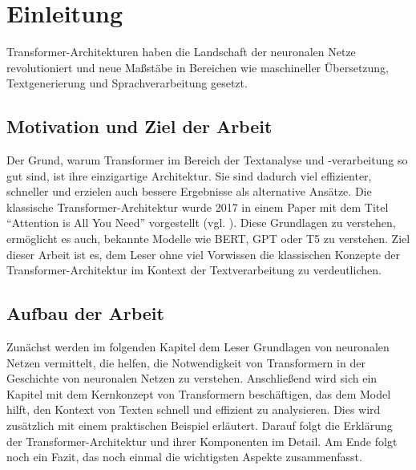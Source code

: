 \chapter{Einleitung}

Transformer-Architekturen haben die Landschaft der neuronalen Netze revolutioniert und neue Maßstäbe in Bereichen wie maschineller Übersetzung, Textgenerierung und Sprachverarbeitung gesetzt.  

\section{Motivation und Ziel der Arbeit}

Der Grund, warum Transformer im Bereich der Textanalyse und -verarbeitung so gut sind, ist ihre einzigartige Architektur.  
Sie sind dadurch viel effizienter, schneller und erzielen auch bessere Ergebnisse als alternative Ansätze.  
Die klassische Transformer-Architektur wurde 2017 in einem Paper mit dem Titel \enquote{Attention is All You Need} vorgestellt (vgl. \cite{attention}).  
Diese Grundlagen zu verstehen, ermöglicht es auch, bekannte Modelle wie BERT, GPT oder T5 zu verstehen.  
Ziel dieser Arbeit ist es, dem Leser ohne viel Vorwissen die klassischen Konzepte der Transformer-Architektur im Kontext der Textverarbeitung zu verdeutlichen.  

\section{Aufbau der Arbeit}

Zunächst werden im folgenden Kapitel dem Leser Grundlagen von neuronalen Netzen vermittelt, die helfen, die Notwendigkeit von Transformern in der Geschichte von neuronalen Netzen zu verstehen.  
Anschließend wird sich ein Kapitel mit dem Kernkonzept von Transformern beschäftigen, das dem Model hilft, den Kontext von Texten schnell und effizient zu analysieren.  
Dies wird zusätzlich mit einem praktischen Beispiel erläutert.  
Darauf folgt die Erklärung der Transformer-Architektur und ihrer Komponenten im Detail.  
Am Ende folgt noch ein Fazit, das noch einmal die wichtigsten Aspekte zusammenfasst.  
